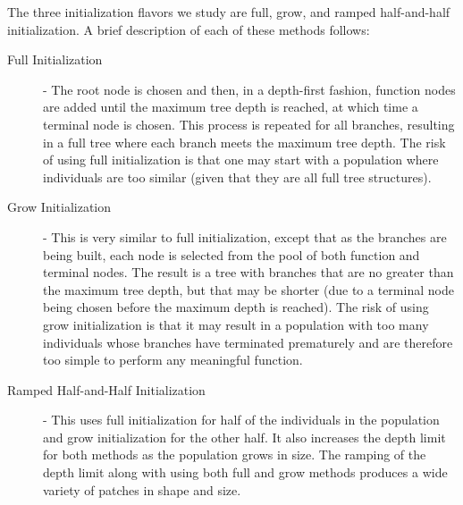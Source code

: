 \documentclass[12pt]{report} 	%
\numberwithin{figure}{chapter}
\numberwithin{table}{chapter}
\numberwithin{equation}{chapter}
\begin{document}
\begin{flushleft}
The three initialization flavors we study are full, grow, and ramped half-and-half initialization. A brief description of each of these methods follows:
\begin{description}
\item [Full Initialization] - The root node is chosen and then, in a depth-first fashion, function nodes are added until the maximum tree depth is reached, at which time a terminal node is chosen. This process is repeated for all branches, resulting in a full tree where each branch meets the maximum tree depth. The risk of using full initialization is that one may start with a population where individuals are too similar (given that they are all full tree structures).
\item [Grow Initialization] - This is very similar to full initialization, except that as the branches are being built, each node is selected from the pool of both function and terminal nodes. The result is a tree with branches that are no greater than the maximum tree depth, but that may be shorter (due to a terminal node being chosen before the maximum depth is reached). The risk of using grow initialization is that it may result in a population with too many individuals whose branches have terminated prematurely and are therefore too simple to perform any meaningful function.
\item [Ramped Half-and-Half Initialization] - This uses full initialization for half of the individuals in the population and grow initialization for the other half. It also increases the depth limit for both methods as the population grows in size. The ramping of the depth limit along with using both full and grow methods produces a wide variety of patches in shape and size.
\end{description}


\end{flushleft}
\end{document}
